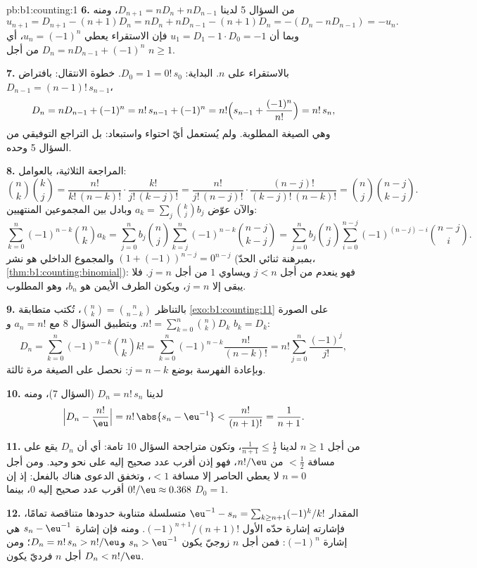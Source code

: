 \begin{solution}{pb:b1:counting:1}
\textbf{6.} من السؤال 5 لدينا $D_{n+1} = nD_n + nD_{n-1}$، ومنه
\[
u_{n+1} = D_{n+1} - (n+1)D_n = nD_n + nD_{n-1} - (n+1)D_n
= -(D_n - nD_{n-1}) = -u_n .
\]
وبما أن $u_1 = D_1 - 1 \cdot D_0 = -1$ فإن الاستقراء يعطي $u_n =
(-1)^n$، أي $D_n = nD_{n-1} + (-1)^n$ من أجل $n \geq 1$.

\textbf{7.} بالاستقراء على $n$. البداية: $D_0 = 1 = 0!\,s_0$. خطوة
الانتقال: بافتراض $D_{n-1} = (n-1)!\,s_{n-1}$،
\[
D_n = nD_{n-1} + (-1)^n = n!\,s_{n-1} + (-1)^n
= n!\Bigl(s_{n-1} + \frac{(-1)^n}{n!}\Bigr) = n!\,s_n ,
\]
وهي الصيغة المطلوبة. ولم يُستعمل أيّ احتواء واستبعاد: بل التراجع
التوفيقي من السؤال 5 وحده.

\textbf{8.} المراجعة الثلاثية، بالعوامل:
\[
\binom nk \binom kj
= \frac{n!}{k!\,(n-k)!} \cdot \frac{k!}{j!\,(k-j)!}
= \frac{n!}{j!\,(n-j)!} \cdot \frac{(n-j)!}{(k-j)!\,(n-k)!}
= \binom nj \binom{n-j}{k-j} .
\]
والآن عوّض $a_k = \sum_j \binom kj b_j$ وبادل بين المجموعين
المنتهيين:
\[
\sum_{k=0}^{n} (-1)^{n-k} \binom nk a_k
= \sum_{j=0}^{n} b_j \binom nj
\sum_{k=j}^{n} (-1)^{n-k} \binom{n-j}{k-j}
= \sum_{j=0}^{n} b_j \binom nj
\sum_{i=0}^{n-j} (-1)^{(n-j)-i} \binom{n-j}{i} .
\]
والمجموع الداخلي هو نشر $(1 + (-1))^{n-j} = 0^{n-j}$
(بمبرهنة ثنائي الحدّ، \cref{thm:b1:counting:binomial}): فهو ينعدم
من أجل $j < n$ ويساوي $1$ من أجل $j = n$. فلا يبقى إلا $j = n$، ويكون
الطرف الأيمن هو $b_n$، وهو المطلوب.

\textbf{9.} بالتناظر $\binom nk = \binom n{n-k}$، تُكتب
متطابقة \cref{exo:b1:counting:11} على الصورة $n! =
\sum_{k=0}^n \binom nk D_k$. وبتطبيق السؤال 8 مع $a_n = n!$ و
$b_k = D_k$:
\[
D_n = \sum_{k=0}^{n} (-1)^{n-k} \binom nk k!
= \sum_{k=0}^{n} (-1)^{n-k} \frac{n!}{(n-k)!}
= n! \sum_{j=0}^{n} \frac{(-1)^j}{j!} ,
\]
وبإعادة الفهرسة بوضع $j = n - k$: نحصل على الصيغة مرة ثالثة.

\textbf{10.} لدينا $D_n = n!\,s_n$ (السؤال 7)، ومنه
\[
\Bigl| D_n - \frac{n!}{\eu} \Bigr|
= n!\,\abs{s_n - \eu^{-1}} < \frac{n!}{(n+1)!} = \frac1{n+1} .
\]

\textbf{11.} من أجل $n \geq 1$ لدينا $\frac1{n+1} \leq \frac12$، وتكون
متراجحة السؤال 10 تامة: أي أن $D_n$ يقع على مسافة
$< \frac12$ من $n!/\eu$، فهو إذن أقرب عدد صحيح إليه على نحو وحيد.
ومن أجل $n = 0$ لا يعطي الحاصر إلا مسافة $< 1$، وتخفق الدعوى هناك
بالفعل: إذ إن $0!/\eu \approx 0.368$ أقرب عدد صحيح إليه $0$، بينما
$D_0 = 1$.

\textbf{12.} المقدار $\eu^{-1} - s_n = \sum_{k \geq n+1} (-1)^k/k!$ متسلسلة
متناوبة حدودها متناقصة تمامًا، فإشارته إشارة حدّه الأول
$(-1)^{n+1}/(n+1)!$. ومنه فإن إشارة $s_n -
\eu^{-1}$ هي إشارة $(-1)^n$: فمن أجل $n$ زوجيّ يكون $s_n > \eu^{-1}$
و$D_n = n!\,s_n > n!/\eu$؛ ومن أجل $n$ فرديّ يكون $D_n < n!/\eu$.


\end{solution}
